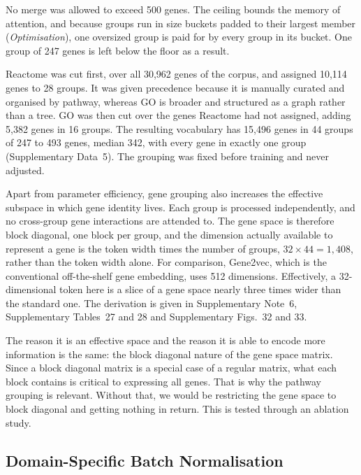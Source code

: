 No merge was allowed to exceed 500 genes. The ceiling bounds the memory of
attention, and because groups run in size buckets padded to their largest
member (\emph{Optimisation}), one oversized group is paid for by every group
in its bucket. One group of 247 genes is left below the floor as a result.

Reactome was cut first, over all 30{,}962 genes of the corpus, and assigned
10{,}114 genes to 28 groups. It was given precedence because it is manually
curated and organised by pathway, whereas GO is broader and structured as a
graph rather than a tree. GO was then cut over the genes Reactome had not
assigned, adding 5{,}382 genes in 16 groups. The resulting vocabulary has
15{,}496 genes in 44 groups of 247 to 493 genes, median 342, with every gene
in exactly one group (Supplementary Data~5). The grouping was fixed before
training and never adjusted.

Apart from parameter efficiency, gene grouping also increases the effective
subspace in which gene identity lives. Each group is processed independently, and
no cross-group gene interactions are attended to. The gene space is 
therefore block diagonal, one block per group, and the dimension actually 
available to represent a gene is the token width times the number of groups,
$32 \times 44 = 1{,}408$, rather than the token width alone. For
comparison, Gene2vec, which is the conventional off-the-shelf gene
embedding, uses 512 dimensions. Effectively, a 32-dimensional token here
is a slice of a gene space nearly three times wider than the standard one. The 
derivation is given in Supplementary Note~6, Supplementary Tables~27 and 28
and Supplementary Figs.~32 and 33.

The reason it is an effective space and the reason it is able to encode 
more information is the same: the block diagonal nature of the gene space 
matrix. Since a block diagonal matrix is a special case of a regular matrix, 
what each block contains is critical to expressing all genes. That is why 
the pathway grouping is relevant. Without that, we would be restricting the 
gene space to block diagonal and getting nothing in return. This is tested 
through an ablation study.


\subsection*{Domain-Specific Batch Normalisation}


